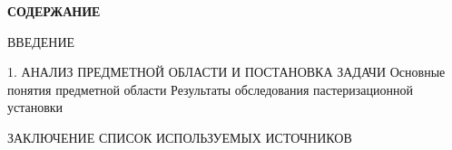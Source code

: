{\cyrillicfont \fontsize{14pt}{0pt}\selectfont \englishfont \bfseries
    СОДЕРЖАНИЕ
    \vspace{42pt}
} 

{\cyrillicfont 
\fontsize{13pt}{15.6pt}\selectfont 
\englishfont

    ВВЕДЕНИЕ  \newline

    1. АНАЛИЗ ПРЕДМЕТНОЙ ОБЛАСТИ И ПОСТАНОВКА ЗАДАЧИ   Основные понятия предметной области   Результаты обследования пастеризационной установки \newline

    ЗАКЛЮЧЕНИЕ  \newline
    СПИСОК ИСПОЛЬЗУЕМЫХ ИСТОЧНИКОВ  \newline
}